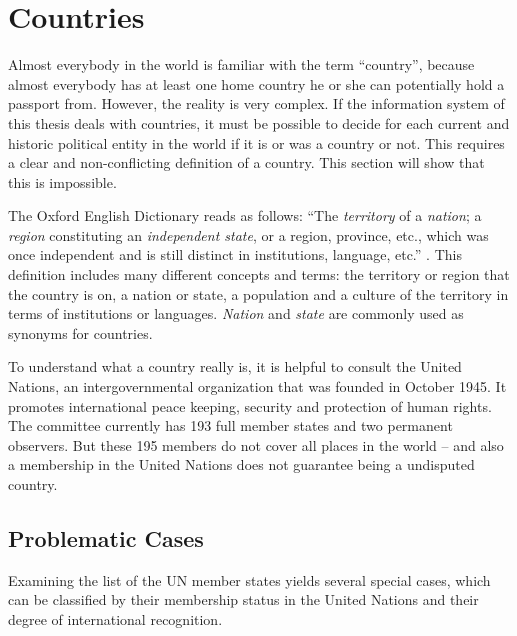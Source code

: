 \section{Countries} %
\label{sec:countries}

Almost everybody in the world is familiar with the term ``country'', because almost everybody has at least one home country he or she can potentially hold a passport from. However, the reality is very complex. If the information system of this thesis deals with countries, it must be possible to decide for each current and historic political entity in the world if it is or was a country or not. This requires a clear and non-conflicting definition of a country. This section will show that this is impossible.

The Oxford English Dictionary reads as follows: ``The \emph{territory} of a \emph{nation}; a \emph{region} constituting an \emph{independent state}, or a region, province, etc., which was once independent and is still distinct in institutions, language, etc.'' \cite{oxendict}.
This definition includes many different concepts and terms: the territory or region that the country is on, a nation or state, a population and a culture of the territory in terms of institutions or languages. \emph{Nation} and \emph{state} are commonly used as synonyms for countries.

To understand what a country really is, it is helpful to consult the United Nations, an intergovernmental organization that was founded in October 1945. It promotes international peace keeping, security and protection of human rights. The committee currently has 193 full member states and two permanent observers\cite{UNmembers}. But these 195 members do not cover all places in the world -- and also a membership in the United Nations does not guarantee being a undisputed country.

\subsection{Problematic Cases} %
\label{sub:special_cases}

Examining the list of the UN member states yields several special cases, which can be classified by their membership status in the United Nations and their degree of international recognition.



